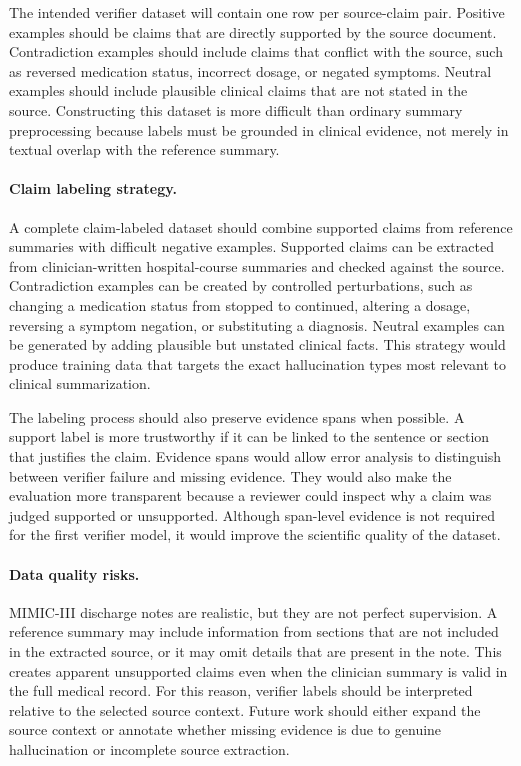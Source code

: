 \documentclass[11pt]{article}
\begin{document}
The intended verifier dataset will contain one row per source-claim pair. Positive examples should be claims that are directly supported by the source document. Contradiction examples should include claims that conflict with the source, such as reversed medication status, incorrect dosage, or negated symptoms. Neutral examples should include plausible clinical claims that are not stated in the source. Constructing this dataset is more difficult than ordinary summary preprocessing because labels must be grounded in clinical evidence, not merely in textual overlap with the reference summary.

\paragraph{Claim labeling strategy.}
A complete claim-labeled dataset should combine supported claims from reference summaries with difficult negative examples. Supported claims can be extracted from clinician-written hospital-course summaries and checked against the source. Contradiction examples can be created by controlled perturbations, such as changing a medication status from stopped to continued, altering a dosage, reversing a symptom negation, or substituting a diagnosis. Neutral examples can be generated by adding plausible but unstated clinical facts. This strategy would produce training data that targets the exact hallucination types most relevant to clinical summarization.

The labeling process should also preserve evidence spans when possible. A support label is more trustworthy if it can be linked to the sentence or section that justifies the claim. Evidence spans would allow error analysis to distinguish between verifier failure and missing evidence. They would also make the evaluation more transparent because a reviewer could inspect why a claim was judged supported or unsupported. Although span-level evidence is not required for the first verifier model, it would improve the scientific quality of the dataset.

\paragraph{Data quality risks.}
MIMIC-III discharge notes are realistic, but they are not perfect supervision. A reference summary may include information from sections that are not included in the extracted source, or it may omit details that are present in the note. This creates apparent unsupported claims even when the clinician summary is valid in the full medical record. For this reason, verifier labels should be interpreted relative to the selected source context. Future work should either expand the source context or annotate whether missing evidence is due to genuine hallucination or incomplete source extraction.
\end{document}

